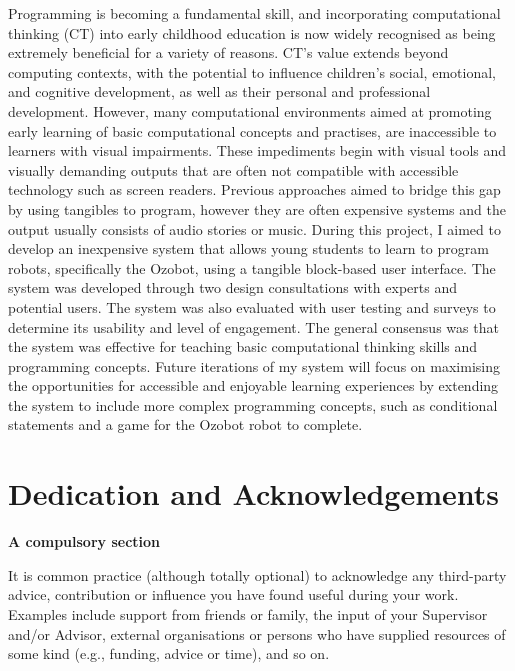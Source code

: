 \documentclass[oneside,%
                    author={Malak Hajji},
                    degree={BSc},
                    title={Designing An Accessible Computational Toolkit For Students},
                  subtitle={With Mixed Visual Abilities}]{dissertation}
\begin{document}
\noindent
Programming is becoming a fundamental skill, and incorporating computational thinking (CT) into early childhood education is now widely recognised as being extremely beneficial for a variety of reasons. CT's value extends beyond computing contexts, with the potential to influence children's social, emotional, and cognitive development, as well as their personal and professional development. However, many computational environments aimed at promoting early learning of basic computational concepts and practises, are inaccessible to learners with visual impairments. These impediments begin  with visual tools and visually demanding outputs that are often not compatible with accessible technology such as screen readers. Previous approaches aimed to bridge this gap by using tangibles to program, however they are often expensive systems and the output usually consists of audio stories or music. During this project, I aimed to develop an inexpensive system that allows young students to learn to program robots, specifically the Ozobot, using a tangible block-based user interface.  The system was developed through two design consultations with experts and potential users. The system was also evaluated with user testing and surveys to determine its usability and level of engagement. The general consensus was that the system was effective for teaching basic computational thinking skills and programming concepts. Future iterations of my system will focus on maximising the opportunities for accessible and enjoyable learning experiences by extending the system to include more complex programming concepts, such as conditional statements and a game for the Ozobot robot to complete.




\chapter*{Dedication and Acknowledgements}

{\bf A compulsory section}
\vspace{1cm} 

\noindent
It is common practice (although totally optional) to acknowledge any
third-party advice, contribution or influence you have found useful
during your work.  Examples include support from friends or family, 
the input of your Supervisor and/or Advisor, external organisations 
or persons who  have supplied resources of some kind (e.g., funding, 
advice or time), and so on.
\end{document}
